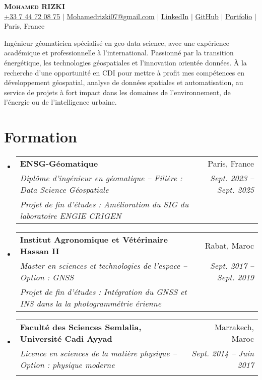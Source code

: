 \documentclass[letterpaper,11pt]{article}
\makeatletter
\newcommand{\resumeEducationHeading}[6]{
  \vspace{-2pt}\item
    \begin{tabular*}{0.97\textwidth}[t]{l@{\extracolsep{\fill}}r}
      \textbf{#1} & #2 \\
      \textit{\small#3} & \textit{\small #4} \\
      \textit{\small#5} & \textit{\small #6} \\
    \end{tabular*}\vspace{-5pt}
}
\newcommand{\resumeSubHeadingListStart}{\begin{itemize}[leftmargin=0.15in, label={}]}
\newcommand{\resumeSubHeadingListEnd}{\end{itemize}}
\makeatother
\begin{document}
\begin{center}
    \textbf{\Huge \scshape Mohamed RIZKI} \\ \vspace{3pt}
    \small
    \faMobile \hspace{.5pt} \href{tel:33744720875}{+33 7 44 72 08 75}
    $|$
    \faAt \hspace{.5pt} \href{mailto:Mohamedrizki07@gmail.com}{Mohamedrizki07@gmail.com}
    $|$
    \faLinkedinSquare \hspace{.5pt} \href{https://www.linkedin.com/in/mohamed-rizki-979b03104/}{LinkedIn}
    $|$
    \faGithub \hspace{.5pt} \href{https://github.com/MohamedRizki}{GitHub}
    $|$
    \faGlobe \hspace{.5pt} \href{https://mohamedrizki.github.io/Portfolio-Mohamed-RIZKI/}{Portfolio}
    $|$
    \faMapMarker \hspace{.5pt} Paris, France
\end{center}


Ingénieur géomaticien spécialisé en geo data science, avec une expérience académique et professionnelle à l'international. Passionné par la transition énergétique, les technologies géospatiales et l'innovation orientée données. À la recherche d'une opportunité en CDI pour mettre à profit mes compétences en développement géospatial, analyse de données spatiales et automatisation, au service de projets à fort impact dans les domaines de l’environnement, de l’énergie ou de l’intelligence urbaine.

\section{Formation}
\vspace{3pt}
\resumeSubHeadingListStart

  \resumeEducationHeading
    {ENSG-Géomatique}{Paris, France}
    {Diplôme d’ingénieur en géomatique – Filière : Data Science Géospatiale}{Sept. 2023 -- Sept. 2025}
    {Projet de fin d’études : Amélioration du SIG du laboratoire ENGIE CRIGEN}{}

  \resumeEducationHeading
    {Institut Agronomique et Vétérinaire Hassan II}{Rabat, Maroc}
    {Master en sciences et technologies de l'espace – Option : GNSS}{Sept. 2017 -- Sept. 2019}
    {Projet de fin d’études : Intégration du GNSS et INS dans la la photogrammétrie érienne}{}

  \resumeEducationHeading
    {Faculté des Sciences Semlalia, Université Cadi Ayyad}{Marrakech, Maroc}
    {Licence en sciences de la matière physique – Option : physique moderne}{Sept. 2014 -- Juin 2017}
    {}{}
\resumeSubHeadingListEnd
\end{document}
